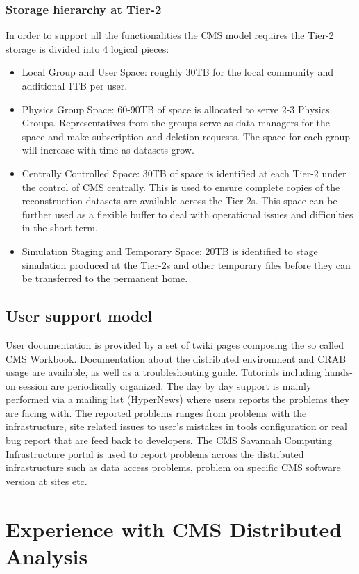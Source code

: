 \subsubsection{Storage hierarchy at Tier-2}
In order to support all the functionalities the CMS model requires the Tier-2 storage is divided into 4 logical pieces:
\begin{itemize}
\item{} Local Group and User Space: roughly 30TB for the local community and additional 1TB per user.
\item{} Physics Group Space: 60-90TB of space is allocated to serve 2-3 Physics Groups. Representatives from the groups serve as data managers for the space and make subscription and deletion requests.
The space for each group will increase with time as datasets grow.
\item{} Centrally Controlled Space: 30TB of space is identified at each Tier-2 under the control of CMS centrally.
This is used to ensure complete copies of the reconstruction datasets are available across the Tier-2s. This space can be further used as a flexible buffer to deal with operational issues and difficulties in the short term.
\item{} Simulation Staging and Temporary Space: 20TB is identified to
stage simulation produced at the Tier-2s and other temporary
files before they can be transferred to the permanent home. 
\end{itemize}

\subsection{User support model}
\label{sec:4_4}
User documentation is provided by a set of twiki pages composing the so called CMS Workbook. Documentation about the distributed environment and CRAB usage are available, as well as a troubleshouting guide.
Tutorials including hands-on session are periodically organized.
The day by day support is mainly performed via a mailing list (HyperNews) where
users reports the problems they are facing with. The reported problems ranges
 from problems with the infrastructure, site related issues to user's mistakes in tools configuration or real bug report that are feed back to developers.
The CMS Savannah Computing Infrastructure portal is used to report problems across the distributed infrastructure such as data access problems, problem on specific CMS software version at sites etc.

\section{Experience with CMS Distributed Analysis}
\label{sec:5}

